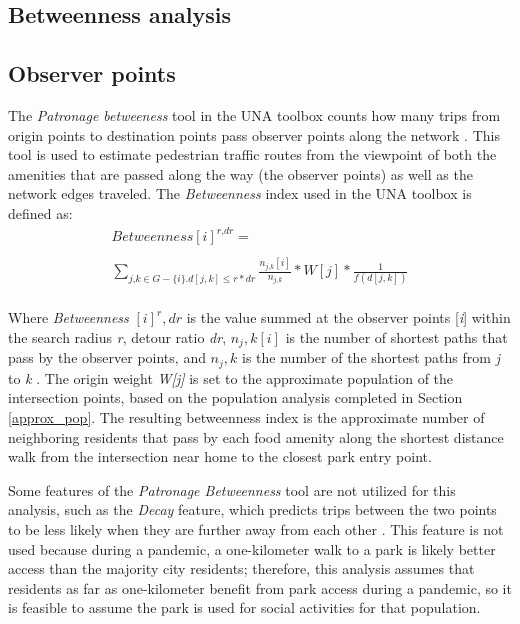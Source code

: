\begin{multicols}{2}

\section{Betweenness analysis}
\subsection{Observer points}
The \textit{Patronage betweeness} tool in the UNA toolbox counts how many trips from origin points to destination points pass observer points along the network \cite{sevtsuk_tale_2022}. This tool is used to estimate pedestrian traffic routes from the viewpoint of both the amenities that are passed along the way (the observer points) as well as the network edges traveled. The \textit{Betweenness} index used in the UNA toolbox is defined as:
\begin{multline}
        \textit{Betweenness}[\textit{i}]^{\textit{r,dr}} = \\
        \\
        \sum_{\textit{j,k}\in\textit{G}-\{\textit{i}\}.\textit{d}[\textit{j},\textit{k}]\le\textit{r}*\textit{dr}} \frac{n_\textit{j,k} [i]}{n_\textit{j,k}} * \textit{W}[\textit{j}] * \frac{1}{f(d[j,k])}\\
        \label{eqn:betweenness_eqn}
\end{multline}

Where \textit{Betweenness} $[i]^r,dr$ is the value summed at the observer points [\textit{i}] within the search radius \textit{r}, detour ratio \textit{dr}, $n_j,k[i]$ is the number of shortest paths that pass by the observer points, and $n_j,k$ is the number of the shortest paths from \textit{j} to \textit{k} \cite{sevtsuk_tale_2022}. The origin weight \textit{W[j]} is set to the approximate population of the intersection points, based on the population analysis completed in Section \ref{approx_pop}. The resulting betweenness index is the approximate number of neighboring residents that pass by each food amenity along the shortest distance walk from the intersection near home to the closest park entry point.

Some features of the \textit{Patronage Betweenness} tool are not utilized for this analysis, such as the \textit{Decay} feature, which predicts trips between the two points to be less likely when they are further away from each other \cite{sevtsuk_tale_2022}. This feature is not used because during a pandemic, a one-kilometer walk to a park is likely better access than the majority city residents; therefore, this analysis assumes that residents as far as one-kilometer benefit from park access during a pandemic, so it is feasible to assume the park is used for social activities for that population. 

\end{multicols}

